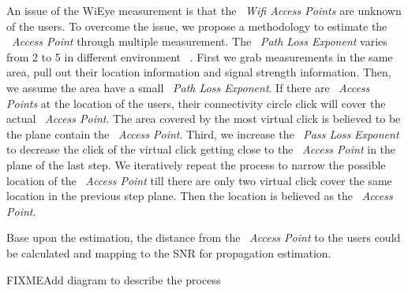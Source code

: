 An issue of the WiEye measurement is that the ~\emph{Wifi Access Points} are unknown of the users. To overcome the issue, we propose a methodology to estimate the ~\emph{Access Point} through multiple measurement.
The ~\emph{Path Loss Exponent} varies from 2 to 5 in different environment ~\cite{camp2006measurement}. 
First we grab measurements in the same area, pull out their location information and signal strength information.
Then, we assume the area have a small ~\emph{Path Loss Exponent}. If there are ~\emph{Access Points} at the location of the users, their connectivity circle click will cover the actual ~\emph{Access Point}. The area covered by the most virtual click is believed to be the plane contain the ~\emph{Access Point}.
Third, we increase the ~\emph{Pass Loss Exponent} to decrease the click of the virtual click getting close to the ~\emph{Access Point} in the plane of the last step. We iteratively repeat the process to narrow the possible location of the ~\emph{Access Point} till there are only two virtual click cover the same location in the previous step plane. 
Then the location is believed as the ~\emph{Access Point}.

Base upon the estimation, the distance from the ~\emph{Access Point} to the users could be calculated and mapping to the SNR for propagation estimation.

FIXME{Add diagram to describe the process}












